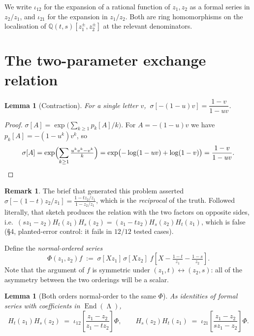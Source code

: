 \documentclass[11pt]{article}
\newtheorem{lemma}[theorem]{Lemma}
\theoremstyle{definition}
\newtheorem{remark}[theorem]{Remark}
\DeclareMathOperator{\Lam}{\Lambda}
\newcommand{\Hop}{H}
\newcommand{\iotain}{\iota_{12}}
\newcommand{\iotaout}{\iota_{21}}
\begin{document}
We write $\iotain$ for the expansion of a rational function of $z_1,z_2$ as a formal series in
$z_2/z_1$, and $\iotaout$ for the expansion in $z_1/z_2$. Both are ring homomorphisms on the
localisation of $\mathbb{Q}(t,s)[z_1^\pm,z_2^\pm]$ at the relevant denominators.

\section{The two-parameter exchange relation}

\begin{lemma}[Contraction]\label{lem:contract}
For a single letter $v$,
$\ \sigma[-(1-u)v]=\dfrac{1-v}{1-uv}$.
\end{lemma}

\begin{proof}
$\sigma[A]=\exp\bigl(\sum_{k\ge1}p_k[A]/k\bigr)$. For $A=-(1-u)v$ we have $p_k[A]=-(1-u^k)v^k$, so
\[
  \sigma[A]=\exp\Bigl(\sum_{k\ge1}\tfrac{u^kv^k-v^k}{k}\Bigr)
  =\exp\bigl(-\log(1-uv)+\log(1-v)\bigr)=\frac{1-v}{1-uv}. \qedhere
\]
\end{proof}

\begin{remark}\label{rem:brief-inverted}
The brief that generated this problem asserted
$\sigma[-(1-t)z_2/z_1]=\frac{1-tz_2/z_1}{1-z_2/z_1}$, which is the \emph{reciprocal} of the
truth. Followed literally, that sketch produces the relation with the two factors on opposite
sides, i.e.\ $(sz_1-z_2)\Hop_t(z_1)\Hop_s(z_2)=(z_1-tz_2)\Hop_s(z_2)\Hop_t(z_1)$, which is
false (\S4, planted-error control: it fails in $12/12$ tested cases).
\end{remark}

Define the \emph{normal-ordered series}
\begin{equation}\label{eq:Phi}
  \Phi(z_1,z_2)f\;:=\;\sigma[Xz_1]\,\sigma[Xz_2]\;
  f\!\left[X-\tfrac{1-t}{z_1}-\tfrac{1-s}{z_2}\right].
\end{equation}
Note that the argument of $f$ is symmetric under $(z_1,t)\leftrightarrow(z_2,s)$: all of the
asymmetry between the two orderings will be a scalar.

\begin{lemma}[Both orders normal-order to the same $\Phi$]\label{lem:both}
As identities of formal series with coefficients in $\operatorname{End}(\Lam)$,
\[
  \Hop_t(z_1)\Hop_s(z_2)\;=\;\iotain\!\left[\frac{z_1-z_2}{z_1-t z_2}\right]\Phi,
  \qquad
  \Hop_s(z_2)\Hop_t(z_1)\;=\;\iotaout\!\left[\frac{z_1-z_2}{s z_1-z_2}\right]\Phi .
\]
\end{lemma}
\end{document}
